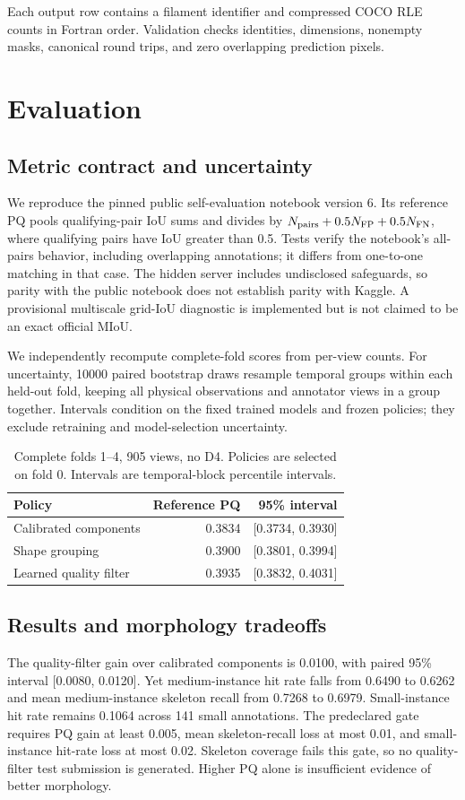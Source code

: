 \documentclass[sigconf]{acmart}
\begin{document}
Each output row contains a filament identifier and compressed COCO RLE counts in Fortran order. Validation checks identities, dimensions, nonempty masks, canonical round trips, and zero overlapping prediction pixels.

\section{Evaluation}
\subsection{Metric contract and uncertainty}
We reproduce the pinned public self-evaluation notebook version 6. Its reference PQ pools qualifying-pair IoU sums and divides by $N_{\rm pairs}+0.5N_{\rm FP}+0.5N_{\rm FN}$, where qualifying pairs have IoU greater than 0.5. Tests verify the notebook's all-pairs behavior, including overlapping annotations; it differs from one-to-one matching in that case. The hidden server includes undisclosed safeguards, so parity with the public notebook does not establish parity with Kaggle. A provisional multiscale grid-IoU diagnostic is implemented but is not claimed to be an exact official MIoU.

We independently recompute complete-fold scores from per-view counts. For uncertainty, 10000 paired bootstrap draws resample temporal groups within each held-out fold, keeping all physical observations and annotator views in a group together. Intervals condition on the fixed trained models and frozen policies; they exclude retraining and model-selection uncertainty.

\begin{table}[t]
\caption{Complete folds 1--4, 905 views, no D4. Policies are selected on fold 0. Intervals are temporal-block percentile intervals.}
\label{tab:full}
\centering\small
\begin{tabular}{lrr}
\toprule Policy & Reference PQ & 95\% interval\\\midrule
Calibrated components & 0.3834 & [0.3734, 0.3930]\\
Shape grouping & 0.3900 & [0.3801, 0.3994]\\
Learned quality filter & 0.3935 & [0.3832, 0.4031]\\\bottomrule
\end{tabular}
\end{table}

\subsection{Results and morphology tradeoffs}
The quality-filter gain over calibrated components is 0.0100, with paired 95\% interval [0.0080, 0.0120]. Yet medium-instance hit rate falls from 0.6490 to 0.6262 and mean medium-instance skeleton recall from 0.7268 to 0.6979. Small-instance hit rate remains 0.1064 across 141 small annotations. The predeclared gate requires PQ gain at least 0.005, mean skeleton-recall loss at most 0.01, and small-instance hit-rate loss at most 0.02. Skeleton coverage fails this gate, so no quality-filter test submission is generated. Higher PQ alone is insufficient evidence of better morphology.
\end{document}
